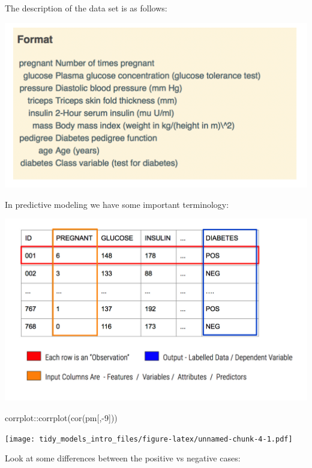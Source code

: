 \documentclass[
]{article}
\newenvironment{Shaded}{\begin{snugshade}}{\end{snugshade}}
\newcommand{\AttributeTok}[1]{\textcolor[rgb]{0.77,0.63,0.00}{#1}}
\newcommand{\DecValTok}[1]{\textcolor[rgb]{0.00,0.00,0.81}{#1}}
\newcommand{\FunctionTok}[1]{\textcolor[rgb]{0.00,0.00,0.00}{#1}}
\newcommand{\NormalTok}[1]{#1}
\newcommand{\OtherTok}[1]{\textcolor[rgb]{0.56,0.35,0.01}{#1}}
\newcommand{\SpecialCharTok}[1]{\textcolor[rgb]{0.00,0.00,0.00}{#1}}
\newcommand{\StringTok}[1]{\textcolor[rgb]{0.31,0.60,0.02}{#1}}
\begin{document}
The description of the data set is as follows:

\includegraphics{./IMG/description.png}

In predictive modeling we have some important terminology:

\includegraphics{./IMG/features.png}

\begin{Shaded}
\begin{Highlighting}[]
\NormalTok{corrplot}\SpecialCharTok{::}\FunctionTok{corrplot}\NormalTok{(}\FunctionTok{cor}\NormalTok{(pm[,}\SpecialCharTok{{-}}\DecValTok{9}\NormalTok{]))}
\end{Highlighting}
\end{Shaded}

\texttt{[image: tidy\_models\_intro\_files/figure-latex/unnamed-chunk-4-1.pdf]}

Look at some differences between the positive vs negative cases:

\begin{Shaded}
\end{Shaded}
\end{document}
